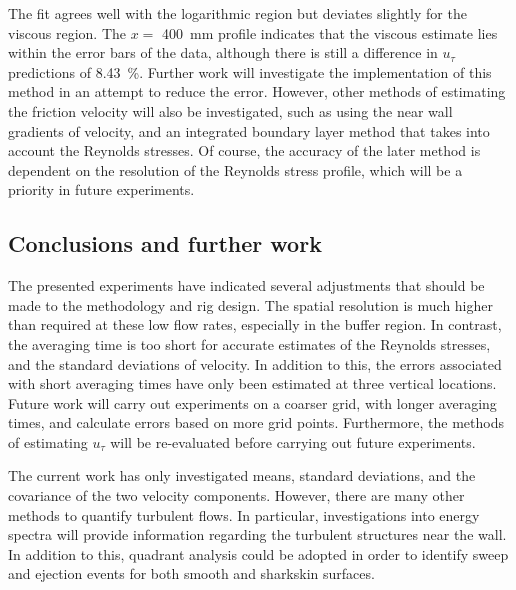 \documentclass[12pt,oneside,a4paper]{article}
\begin{document}
%
The fit agrees well with the logarithmic region but deviates slightly for the viscous region. The $x=$ \SI{400}{mm} profile indicates that the viscous estimate lies within the error bars of the data, although there is still a difference in $u_\tau$ predictions of \SI{8.43}{\%}. Further work will investigate the implementation of this method in an attempt to reduce the error. However, other methods of estimating the friction velocity will also be investigated, such as using the near wall gradients of velocity, and an integrated boundary layer method that takes into account the Reynolds stresses. Of course, the accuracy of the later method is dependent on the resolution of the Reynolds stress profile, which will be a priority in future experiments. 

\subsection{Conclusions and further work}
The presented experiments have indicated several adjustments that should be made to the methodology and rig design. The spatial resolution is much higher than required at these low flow rates, especially in the buffer region. In contrast, the averaging time is too short for accurate estimates of the Reynolds stresses, and the standard deviations of velocity. In addition to this, the errors associated with short averaging times have only been estimated at three vertical locations. Future work will carry out experiments on a coarser grid, with longer averaging times, and calculate errors based on more grid points. Furthermore, the methods of estimating $u_\tau$ will be re-evaluated before carrying out future experiments.

The current work has only investigated means, standard deviations, and the covariance of the two velocity components. However, there are many other methods to quantify turbulent flows. In particular, investigations into energy spectra will provide information regarding the turbulent structures near the wall. In addition to this, quadrant analysis could be adopted in order to identify sweep and ejection events for both smooth and sharkskin surfaces.


\newpage
\end{document}
